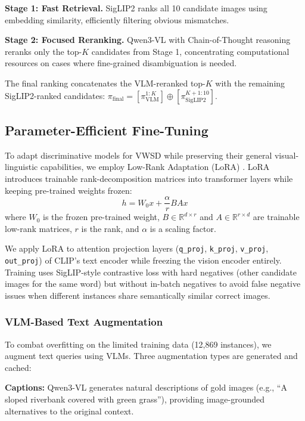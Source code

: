 \documentclass[11pt]{article}
\begin{document}
\textbf{Stage 1: Fast Retrieval.} SigLIP2 ranks all 10 candidate images using embedding similarity, efficiently filtering obvious mismatches.

\textbf{Stage 2: Focused Reranking.} Qwen3-VL with Chain-of-Thought reasoning reranks only the top-$K$ candidates from Stage 1, concentrating computational resources on cases where fine-grained disambiguation is needed.

The final ranking concatenates the VLM-reranked top-$K$ with the remaining SigLIP2-ranked candidates: $\pi_{\text{final}} = [\pi_{\text{VLM}}^{1:K}] \oplus [\pi_{\text{SigLIP2}}^{K+1:10}]$.

\subsection{Parameter-Efficient Fine-Tuning}

To adapt discriminative models for VWSD while preserving their general visual-linguistic capabilities, we employ Low-Rank Adaptation (LoRA) \cite{hu2022lora}. LoRA introduces trainable rank-decomposition matrices into transformer layers while keeping pre-trained weights frozen:
\begin{equation}
h = W_0 x + \frac{\alpha}{r} BA x
\end{equation}
where $W_0$ is the frozen pre-trained weight, $B \in \mathbb{R}^{d \times r}$ and $A \in \mathbb{R}^{r \times d}$ are trainable low-rank matrices, $r$ is the rank, and $\alpha$ is a scaling factor.

We apply LoRA to attention projection layers (\texttt{q\_proj}, \texttt{k\_proj}, \texttt{v\_proj}, \texttt{out\_proj}) of CLIP's text encoder while freezing the vision encoder entirely. Training uses SigLIP-style contrastive loss with hard negatives (other candidate images for the same word) but without in-batch negatives to avoid false negative issues when different instances share semantically similar correct images.

\subsubsection{VLM-Based Text Augmentation}

To combat overfitting on the limited training data (12,869 instances), we augment text queries using VLMs. Three augmentation types are generated and cached:

\textbf{Captions:} Qwen3-VL generates natural descriptions of gold images (e.g., ``A sloped riverbank covered with green grass''), providing image-grounded alternatives to the original context.
\end{document}
